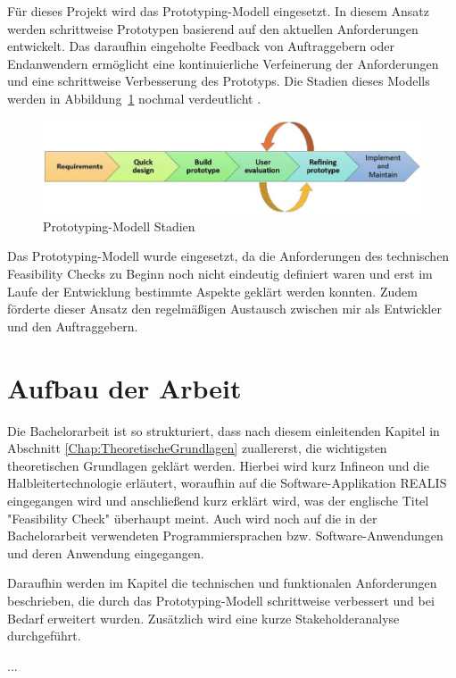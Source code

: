 Für dieses Projekt wird das Prototyping-Modell eingesetzt. In diesem Ansatz werden schrittweise Prototypen basierend auf den aktuellen Anforderungen entwickelt. Das daraufhin eingeholte Feedback von Auftraggebern oder Endanwendern ermöglicht eine kontinuierliche Verfeinerung der Anforderungen und eine schrittweise Verbesserung des Prototyps. Die Stadien dieses Modells werden in Abbildung~\ref{fig:Prototyping-Modell} nochmal verdeutlicht \cite{senarath2021waterfall}.

\begin{figure}[h!]
    \centering
    \includegraphics[]{bilder/Prototyping_Stages.jpg}
    \caption{Prototyping-Modell Stadien}
    \label{fig:Prototyping-Modell}
\end{figure}

Das Prototyping-Modell wurde eingesetzt, da die Anforderungen des technischen Feasibility Checks zu Beginn noch nicht eindeutig definiert waren und erst im Laufe der Entwicklung bestimmte Aspekte geklärt werden konnten. Zudem förderte dieser Ansatz den regelmäßigen Austausch zwischen mir als Entwickler und den Auftraggebern.

\section{Aufbau der Arbeit}
Die Bachelorarbeit ist so strukturiert, dass nach diesem einleitenden Kapitel in Abschnitt \ref{Chap:TheoretischeGrundlagen} zuallererst, die wichtigsten theoretischen Grundlagen geklärt werden. 
Hierbei wird kurz Infineon und die Halbleitertechnologie erläutert, woraufhin auf die Software-Applikation \ac{REALIS} eingegangen wird und anschließend kurz erklärt wird, was der englische Titel "Feasibility Check" überhaupt meint. Auch wird noch auf die in der Bachelorarbeit verwendeten Programmiersprachen bzw. Software-Anwendungen und deren Anwendung eingegangen.

Daraufhin werden im Kapitel  die technischen und funktionalen Anforderungen beschrieben, die durch das Prototyping-Modell schrittweise verbessert und bei Bedarf erweitert wurden. Zusätzlich wird eine kurze Stakeholderanalyse durchgeführt.

...

